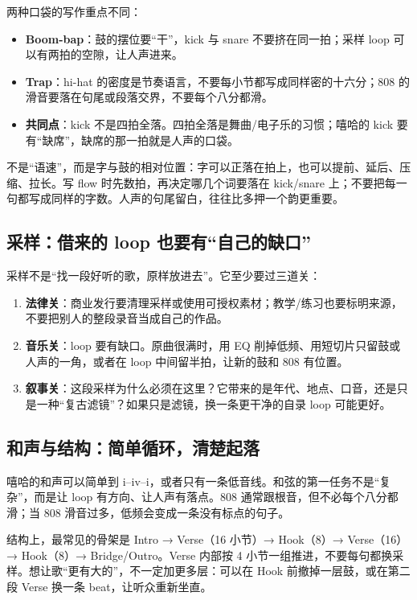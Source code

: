 两种口袋的写作重点不同：

\begin{itemize}
\item \textbf{Boom-bap}：鼓的摆位要“干”，kick 与 snare 不要挤在同一拍；采样 loop 可以有两拍的空隙，让人声进来。
\item \textbf{Trap}：hi-hat 的密度是节奏语言，不要每小节都写成同样密的十六分；808 的滑音要落在句尾或段落交界，不要每个八分都滑。
\item \textbf{共同点}：kick 不是四拍全落。四拍全落是舞曲/电子乐的习惯；嘻哈的 kick 要有“缺席”，缺席的那一拍就是人声的口袋。
\end{itemize}

不是“语速”，而是字与鼓的相对位置：字可以正落在拍上，也可以提前、延后、压缩、拉长。写 flow 时先数拍，再决定哪几个词要落在 kick/snare 上；不要把每一句都写成同样的字数。人声的句尾留白，往往比多押一个韵更重要。

\subsection{采样：借来的 loop 也要有“自己的缺口”}
\label{sec:hiphop-sample}

采样不是“找一段好听的歌，原样放进去”。它至少要过三道关：

\begin{enumerate}
\item \textbf{法律关}：商业发行要清理采样或使用可授权素材；教学/练习也要标明来源，不要把别人的整段录音当成自己的作品。
\item \textbf{音乐关}：loop 要有缺口。原曲很满时，用 EQ 削掉低频、用短切片只留鼓或人声的一角，或者在 loop 中间留半拍，让新的鼓和 808 有位置。
\item \textbf{叙事关}：这段采样为什么必须在这里？它带来的是年代、地点、口音，还是只是一种“复古滤镜”？如果只是滤镜，换一条更干净的自录 loop 可能更好。
\end{enumerate}

\subsection{和声与结构：简单循环，清楚起落}
\label{sec:hiphop-harmony-form}

嘻哈的和声可以简单到 i–iv–i，或者只有一条低音线。和弦的第一任务不是“复杂”，而是让 loop 有方向、让人声有落点。808 通常跟根音，但不必每个八分都滑；当 808 滑音过多，低频会变成一条没有标点的句子。

结构上，最常见的骨架是 Intro → Verse（16 小节）→ Hook（8）→ Verse（16）→ Hook（8）→ Bridge/Outro。Verse 内部按 4 小节一组推进，不要每句都换采样。想让歌“更有大的”，不一定加更多层：可以在 Hook 前撤掉一层鼓，或在第二段 Verse 换一条 beat，让听众重新坐直。

